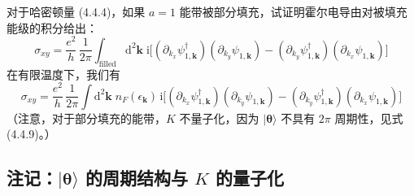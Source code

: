 对于哈密顿量 (4.4.4)，如果 $a = 1$ 能带被部分填充，试证明霍尔电导由对被填充能级的积分给出：
\begin{equation*}
\sigma_{xy} = \frac{e^{2}}{h}\, \frac{1}{2\pi} \int_{\text{filled}} \mathrm{d}^{2}\pmb{k}\; \mathrm{i} \big[ (\partial_{k_{x}} \psi_{1,\pmb{k}}^{\dagger}) (\partial_{k_{y}} \psi_{1,\pmb{k}}) - (\partial_{k_{y}} \psi_{1,\pmb{k}}^{\dagger}) (\partial_{k_{x}} \psi_{1,\pmb{k}}) \big]
\end{equation*}
在有限温度下，我们有
\begin{equation*}
\sigma_{xy} = \frac{e^{2}}{h}\, \frac{1}{2\pi} \int \mathrm{d}^{2}\pmb{k}\; n_{F}(\epsilon_{\pmb{k}})\, \mathrm{i} \big[ (\partial_{k_{x}} \psi_{1,\pmb{k}}^{\dagger}) (\partial_{k_{y}} \psi_{1,\pmb{k}}) - (\partial_{k_{y}} \psi_{1,\pmb{k}}^{\dagger}) (\partial_{k_{x}} \psi_{1,\pmb{k}}) \big]
\end{equation*}
（注意，对于部分填充的能带，$K$ 不量子化，因为 $|\pmb{\theta}\rangle$ 不具有 $2\pi$ 周期性，见式 (4.4.9)。）

\subsection{注记：$|\pmb{\theta}\rangle$ 的周期结构与 $K$ 的量子化}

